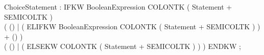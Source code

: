 %
%
%
\begin{rail}
ChoiceStatement : IFKW BooleanExpression COLONTK ( Statement + SEMICOLTK ) \\
                  ( ()
                  | ( ELIFKW BooleanExpression COLONTK ( Statement + SEMICOLTK ) ) + ()
                  ) \\
                  ( ()
                  | ( ELSEKW COLONTK ( Statement + SEMICOLTK ) )
                  )
                  ENDKW ;
\end{rail}
